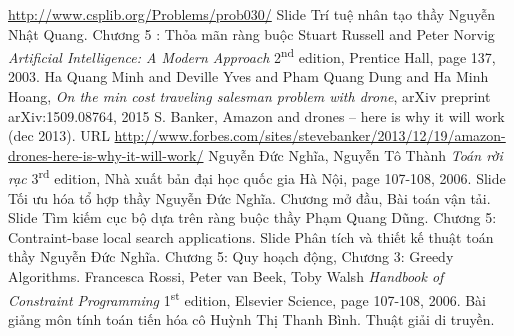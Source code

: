 \documentclass[a4paper,12pt]{report}
\begin{document}
\begin{thebibliography}{9}
 \url{http://www.csplib.org/Problems/prob030/}
 Slide Trí tuệ nhân tạo thầy Nguyễn Nhật Quang. Chương 5 : Thỏa mãn ràng buộc
 Stuart Russell and Peter Norvig 
\textit{Artificial Intelligence: A Modern Approach} 2\textsuperscript{nd } edition, Prentice Hall, page 137,  2003.
 Ha Quang Minh and Deville Yves and Pham Quang Dung and Ha Minh Hoang, \textit{On the min cost traveling salesman problem with drone}, arXiv preprint arXiv:1509.08764, 2015
 S. Banker, Amazon and drones – here is why it will work (dec 2013).
URL \url{http://www.forbes.com/sites/stevebanker/2013/12/19/amazon-drones-here-is-why-it-will-work/}
 Nguyễn Đức Nghĩa, Nguyễn Tô Thành 
\textit{Toán rời rạc} 3\textsuperscript{rd} edition, Nhà xuất bản đại học quốc gia Hà Nội, page 107-108,  2006.
 Slide Tối ưu hóa tổ hợp thầy Nguyễn Đức Nghĩa. Chương mở đầu, Bài toán vận tải.
 Slide Tìm kiếm cục bộ dựa trên ràng buộc thầy Phạm Quang Dũng. Chương 5: Contraint-base local search applications.
 Slide Phân tích và thiết kế thuật toán thầy Nguyễn Đức Nghĩa. Chương 5: Quy hoạch động, Chương 3: Greedy Algorithms.
 Francesca Rossi, Peter van Beek, Toby Walsh 
\textit{Handbook of Constraint Programming} 1\textsuperscript{st} edition, Elsevier Science, page 107-108,  2006.
 Bài giảng môn tính toán tiến hóa cô Huỳnh Thị Thanh Bình. Thuật giải di truyền.
\end{thebibliography}
\end{document}
